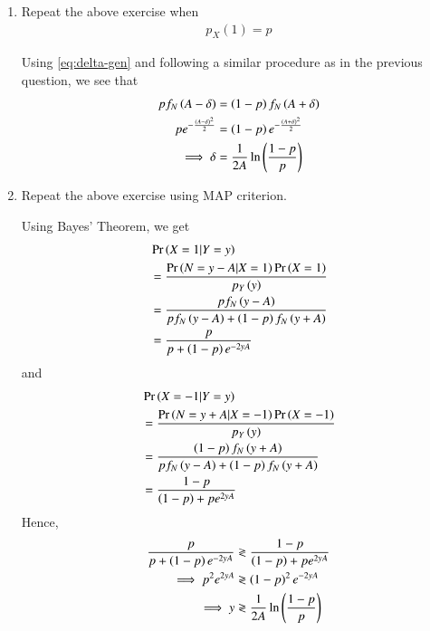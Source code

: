 \documentclass[journal,12pt,twocolumn]{IEEEtran}
\renewcommand\thesection{\arabic{section}}
\begin{document}
\begin{enumerate}[label=\thesection.\arabic*
,ref=\thesection.\theenumi]
\solution
Replacing the $0$ in \eqref{eq:thresh} with $\delta$ and performing a similar operation for $P_{e|1}$, we get
\begin{align}
	P_e &= \pr{X = -1}\qfunc{A + \delta} \nonumber \\ 
	&+ \pr{X = 1}\qfunc{A - \delta} \label{eq:delta-gen} \\
	&= \frac{1}{2}\brak{\qfunc{A + \delta} + \qfunc{A - \delta}} 
	\label{eq:func-delta}
\end{align}
Differentiating with respect to $\delta$ leads to the equation (here $f_N$ denotes standard normal distibution)
\begin{align}
	f_N\brak{A + \delta} = f_N\brak{A - \delta}
\end{align}
which implies that for $A \neq 0,\ \delta = 0$ and for $A = 0,\ \delta \in \mathbb{R}$. 

\item Repeat the above exercise when 
	\begin{align}
		p_X(1) = p
	\end{align}

\solution Using \eqref{eq:delta-gen} and following a similar procedure as in the previous question, we see that
\begin{align}
	pf_N\left(A - \delta\right) &= \left(1 - p\right)f_N\left(A + \delta\right) \\
	pe^{-\frac{\left(A - \delta\right)^2}{2}} &= \left(1 - p\right)e^{-\frac{\left(A + \delta\right)^2}{2}} \\
	\implies \delta &= \frac{1}{2A}\ln{\ensuremath{\left(\frac{1 - p}{p}\right)}}
	\label{eq:delta-sol}
\end{align}
\item Repeat the above exercise using MAP criterion.

\solution Using Bayes' Theorem, we get
\begin{align}
	&\Pr\left(X = 1 | Y = y\right) \nonumber \\
	&= \frac{\Pr\left(N = y - A | X = 1\right)\Pr\left(X = 1\right)}{p_Y\left(y\right)} \\ 
	&= \frac{pf_N\left(y - A\right)}{pf_N\left(y - A\right) + \left(1 - p\right)f_N\left(y + A\right)} \\
	&= \frac{p}{p + \left(1 - p\right)e^{-2yA}} 
\end{align}
and
\begin{align}
	&\Pr\left(X = -1 | Y = y\right) \nonumber \\
	&= \frac{\Pr\left(N = y + A | X = -1\right)\Pr\left(X = -1\right)}{p_Y\left(y\right)} \\ 
	&= \frac{\left(1 - p\right)f_N\left(y + A\right)}{pf_N\left(y - A\right) + \left(1 - p\right)f_N\left(y + A\right)} \\
	&= \frac{1 - p}{\left(1 - p\right) + pe^{2yA}} 
\end{align}
Hence, 
\begin{align}
	\frac{p}{p + \left(1 - p\right)e^{-2yA}} &\gtrless \frac{1 - p}{\left(1 - p\right) + pe^{2yA}} \\
	\implies p^2e^{2yA} &\gtrless \left(1 - p\right)^2e^{-2yA} \\
	\implies y &\gtrless \frac{1}{2A}\ln{\ensuremath{\left(\frac{1 - p}{p}\right)}}
\end{align}
\end{enumerate}
\end{document}
